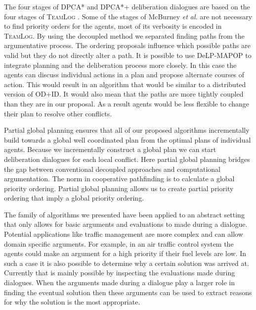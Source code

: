The four stages of DPCA* and DPCA*+ deliberation dialogues are based on the 
four stages of \textsc{TeamLog} \cite{dunin-keplicz2011}. Some of the stages of 
McBurney \emph{et al.}  are not necessary to find 
priority orders for the agents, most of its verbosity is encoded in 
\textsc{TeamLog}. By using the decoupled method we separated finding paths from 
the argumentative process. The ordering proposals influence which possible 
paths are valid but they do not directly alter a path. It is possible to use 
\textsf{DeLP-MAPOP} to integrate planning and the deliberation process more 
closely. In this case the agents can discuss individual actions in a plan and 
propose alternate courses of action. This would result in an algorithm that 
would be similar to a distributed version of OD+ID. It would also mean that the 
paths are more tightly coupled than they are in our proposal. As a result 
agents would be less flexible to change their plan to resolve other conflicts.

Partial global planning ensures that all of our proposed algorithms 
incrementally build towards a global well coordinated plan from the optimal 
plans of individual agents. Because we incrementally construct a global plan we 
can start deliberation dialogues for each local conflict. Here partial global 
planning bridges the gap between conventional decoupled approaches and 
computational argumentation. The norm in cooperative pathfinding is to 
calculate a global priority ordering. Partial global planning allows us to 
create partial priority ordering that imply a global priority ordering.

The family of algorithms we presented have been applied to an abstract setting 
that only allows for basic arguments and evaluations to made during a 
dialogue. Potential applications like traffic management are more complex and 
can allow domain specific arguments. For example, in an air traffic control 
system the agents could make an argument for a high priority if their fuel 
levels are low.
In such a case it is also possible to determine why a certain solution was 
arrived at. Currently that is mainly possible by inspecting the evaluations 
made during dialogues. When the arguments made during a dialogue play a larger 
role in finding the eventual solution then these arguments can be used to 
extract reasons for why the solution is the most appropriate.

